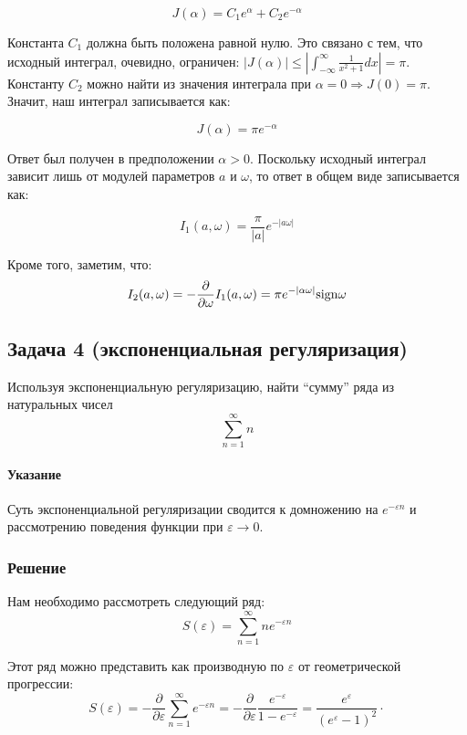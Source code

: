 \documentclass[a4paper,12pt]{article}
\begin{document}
\[
J(\alpha)=C_{1}e^{\alpha}+C_{2}e^{-\alpha}
\]

\noindent
Константа $C_{1}$ должна быть положена равной нулю. Это связано с
тем, что исходный интеграл, очевидно, ограничен: $\left|J\left(\alpha\right)\right|\leq\left|\int_{-\infty}^{\infty}\frac{1}{x^{2}+1}dx\right|=\pi$.
Константу $C_{2}$ можно найти из значения интеграла при $\alpha=0\Rightarrow J(0)=\pi$.
Значит, наш интеграл записывается как:

\[
J(\alpha)=\pi e^{-\alpha}
\]

\noindent
Ответ был получен в предположении $\alpha>0$. Поскольку исходный
интеграл зависит лишь от модулей параметров $a$ и $\omega$, то ответ
в общем виде записывается как:

\[
I_{1}(a,\omega)=\frac{\pi}{\left|a\right|}e^{-\left|a\omega\right|}
\]

\noindent
Кроме того, заметим, что:
\[
I_{2}(a,\omega)=-\frac{\partial}{\partial\omega}I_{1}(a,\omega)=\pi e^{-\left|\alpha\omega\right|}{\rm sign}\omega
\]



\subsection*{Задача 4 (экспоненциальная регуляризация)}

Используя экспоненциальную регуляризацию, найти ``сумму'' ряда из
натуральных чисел 
\[
\sum_{n=1}^{\infty}n
\]



\paragraph{Указание}

Суть экспоненциальной регуляризации сводится к домножению на $e^{-\varepsilon n}$
и рассмотрению поведения функции при $\varepsilon\to0$.


\subsubsection*{Решение}

Нам необходимо рассмотреть следующий ряд:
\[
S(\varepsilon)=\sum_{n=1}^{\infty}ne^{-\varepsilon n}
\]

\noindent
Этот ряд можно представить как производную по $\varepsilon$ от геометрической
прогрессии:
\[
S(\varepsilon)=-\frac{\partial}{\partial\varepsilon}\sum_{n=1}^{\infty}e^{-\varepsilon n}=-\frac{\partial}{\partial\varepsilon}\frac{e^{-\varepsilon}}{1-e^{-\varepsilon}}=\frac{e^{\varepsilon}}{(e^{\varepsilon}-1)^{2}}\cdot
\]
\end{document}
